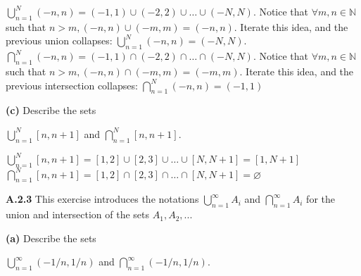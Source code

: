 \documentclass[12pt]{article}
\newcommand{\N}{\mathbb{N}}
\begin{document}
\begin{solution}
\newline $\displaystyle\bigcup_{n=1}^N(-n,n) = \textstyle (-1,1)\cup (-2,2) \cup \dots \cup (-N,N)$.\newline
Notice that $\forall m,n\in \N$ such that $n>m, (-n,n)\cup(-m,m) = (-n,n)$.\newline
Iterate this idea, and the previous union collapses:
\newline $\displaystyle\bigcup_{n=1}^N(-n,n)=(-N,N)$.\newline\newline\newline
$\displaystyle\bigcap_{n=1}^N(-n,n) = (-1,1)\cap (-2,2)\cap\dots\cap(-N,N)$.\newline
Notice that $\forall m,n\in \N$ such that $n>m, (-n,n)\cap(-m,m) = (-m,m)$.\newline
Iterate this idea, and the previous intersection collapses: \newline $\displaystyle\bigcap_{n=1}^N(-n,n) = \textstyle (-1,1)$
\end{solution}
\begin{subproblem}\textbf{(c)}
Describe the sets\newline
\begin{center}
$\displaystyle\bigcup_{n=1}^N[n,n+1]$ and $\displaystyle\bigcap_{n=1}^N[n,n+1]$.
\end{center}
\end{subproblem}
\begin{solution}
\newline$\displaystyle\bigcup_{n=1}^N[n,n+1] = [1,2]\cup[2,3]\cup\dots\cup[N,N+1] = [1,N+1]$
\newline\newline\newline$\displaystyle\bigcap_{n=1}^N[n,n+1]=[1,2]\cap[2,3]\cap\dots\cap[N,N+1]=\varnothing$

\end{solution}
\newpage
\begin{problem}
\textbf{A.2.3} This exercise introduces the notations $\bigcup_{n=1}^\infty A_i$ and $\bigcap_{n=1}^\infty A_i$ for the union and intersection of the sets $A_1, A_2, ...$
\end{problem}
\begin{subproblem}\textbf{(a)}
Describe the sets\newline
\begin{center}
$\displaystyle\bigcup_{n=1}^\infty(-1/n,1/n)$ and $\displaystyle\bigcap_{n=1}^\infty(-1/n,1/n)$.
\end{center}
\end{subproblem}
\end{document}
